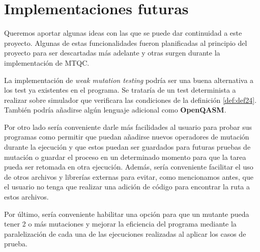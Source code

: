 \section{Implementaciones futuras}

Queremos aportar algunas ideas con las que se puede dar continuidad a este proyecto. Algunas de estas funcionalidades fueron planificadas al principio del proyecto para ser descartadas más adelante y otras surgen durante la implementación de MTQC.

La implementación de \textit{weak mutation testing} podría ser una buena alternativa a los test ya existentes en el programa. Se trataría de un test determinista a realizar sobre simulador que verificara las condiciones de la definición \ref{def:def24}. También podría añadirse algún lenguaje adicional como \textbf{OpenQASM}.

Por otro lado sería conveniente darle más facilidades al usuario para probar sus programas como permitir que puedan añadirse nuevos operadores de mutación durante la ejecución y que estos puedan ser guardados para futuras pruebas de mutación o guardar el proceso en un determinado momento para que la tarea pueda ser retomada en otra ejecución. Además, sería conveniente facilitar el uso de otros archivos y librerías externas para evitar, como mencionamos antes, que el usuario no tenga que realizar una adición de código para encontrar la ruta a estos archivos.

Por último, sería conveniente habilitar una opción para que un mutante pueda tener 2 o más mutaciones y mejorar la eficiencia del programa mediante la paralelización de cada una de las ejecuciones realizadas al aplicar los casos de prueba.


